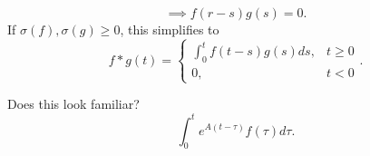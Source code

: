 \begin{theorem}
\begin{property}
\begin{enumerate}
			\[
				\implies f \left( r - s  \right) g \left( s \right)  = 0
			.\] 
			If $\sigma \left( f  \right) , \sigma \left( g \right) \ge  0$, this simplifies to 
			\[
				f * g \left( t  \right) = \begin{cases}
					\int_{ 0}^{t} f \left( t - s  \right) g \left( s \right)  d s , & t \ge  0\\
					0, & t < 0
				\end{cases}
			.\] 
			\begin{observe}
				Does this look familiar?
				\[
					\int_{0 }^{t} e ^{A\left( t - \tau \right) }f \left( \tau \right) d \tau 
				.\] 
			\end{observe}
	\end{enumerate}
\end{property}
\end{theorem}

